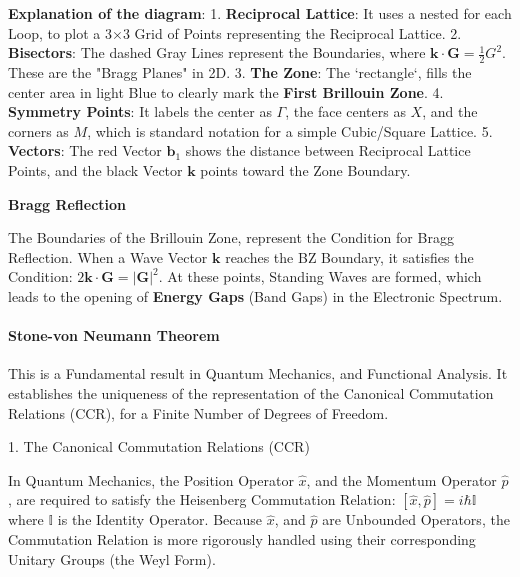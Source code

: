 \documentclass[a4paper, 10pt, onepage]{elegantbook}
\begin{document}
{

   \textbf{Explanation of the diagram}:  
1.  \textbf{Reciprocal Lattice}: It uses a nested for each Loop, to plot a 3$\times$3 Grid of Points representing the 
Reciprocal Lattice.  
2.  \textbf{Bisectors}: The dashed Gray Lines represent the Boundaries, where $\mathbf{k} \cdot \mathbf{G} = 
\frac{1}{2}G^2$. These are the "Bragg Planes" in 2D.  
3.  \textbf{The Zone}: The `rectangle`, fills the center area in light Blue to clearly mark the \textbf{First Brillouin 
Zone}.  
4.  \textbf{Symmetry Points}: It labels the center as $\Gamma$, the face centers as $X$, and the corners as $M$, which 
is standard notation for a simple Cubic/Square Lattice.  
5.  \textbf{Vectors}: The red Vector $\mathbf{b}_1$ shows the distance between Reciprocal Lattice Points, and the black 
Vector $\mathbf{k}$ points toward the Zone Boundary.  

    \textbf{Bragg Reflection}  

The Boundaries of the Brillouin Zone, represent the Condition for Bragg Reflection. When a Wave Vector $\mathbf{k}$ 
reaches the BZ Boundary, it satisfies the Condition:
$ 2\mathbf{k} \cdot \mathbf{G} = |\mathbf{G}|^2$.
At these points, Standing Waves are formed, which leads to the opening of \textbf{Energy Gaps} (Band Gaps) in the 
Electronic Spectrum.

\paragraph{Stone-von Neumann Theorem}  

\noindent

This is a Fundamental result in Quantum Mechanics, and Functional Analysis. It establishes the uniqueness of the 
representation of the Canonical Commutation Relations (CCR), for a Finite Number of Degrees of Freedom.  

    1. The Canonical Commutation Relations (CCR)  

In Quantum Mechanics, the Position Operator $\hat{x}$, and the Momentum Operator $\hat{p}$, are required to satisfy the 
Heisenberg Commutation Relation:
$[\hat{x}, \hat{p}] = i\hbar \mathbb{I} $
where $\mathbb{I}$ is the Identity Operator. Because $\hat{x}$, and $\hat{p}$ are Unbounded Operators, the Commutation 
Relation is more rigorously handled using their corresponding Unitary Groups (the Weyl Form).  

}
\end{document}
